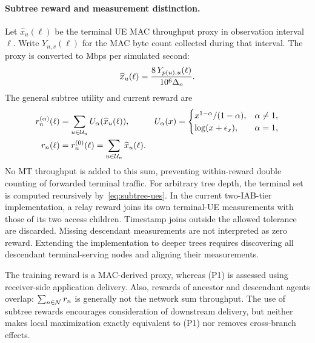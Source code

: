 \begin{EnChapter}
\paragraph{Subtree reward and measurement distinction.}
Let $\widehat x_u(\ell)$ be the terminal UE MAC throughput proxy in observation
interval $\ell$. Write $Y_{n,v}(\ell)$ for the MAC byte count collected
during that interval. The proxy is converted to Mbps per simulated second:
\begin{equation}
  \widehat x_u(\ell)=\frac{8\,Y_{p(u),u}(\ell)}{10^6\Delta_o}.
  \label{eq:mac-proxy}
\end{equation}
The general subtree utility and current reward are
\begin{align}
  r_n^{(\alpha)}(\ell)&=\sum_{u\in\mathcal{U}_n}U_\alpha(\widehat x_u(\ell)), &
  U_\alpha(x)&=
  \begin{cases}
    x^{1-\alpha}/(1-\alpha),&\alpha\ne1,\\
    \log(x+\epsilon_x),&\alpha=1,
  \end{cases}\\
  r_n(\ell)&=r_n^{(0)}(\ell)=\sum_{u\in\mathcal{U}_n}\widehat x_u(\ell).
  \label{eq:reward}
\end{align}
No MT throughput is added to this sum, preventing within-reward double counting
of forwarded terminal traffic. For arbitrary tree depth, the terminal set is
computed recursively by~\eqref{eq:subtree-ues}. In the current two-IAB-tier
implementation, a relay reward joins its own terminal-UE measurements with those
of its two access children. Timestamp joins outside the allowed tolerance are
discarded. Missing descendant measurements are not interpreted as zero reward.
Extending the implementation to deeper trees requires discovering all descendant
terminal-serving nodes and aligning their measurements.

The training reward is a MAC-derived proxy, whereas (P1) is assessed using
receiver-side application delivery. Also, rewards of ancestor and descendant
agents overlap: $\sum_{n\in\mathcal{N}}r_n$ is generally not the network sum throughput.
The use of subtree rewards encourages consideration of downstream delivery, but
neither makes local maximization exactly equivalent to (P1) nor removes
cross-branch effects.


\end{EnChapter}

